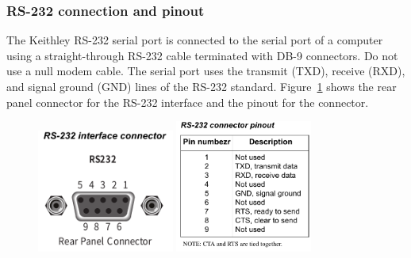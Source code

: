 \subsubsection{RS-232 connection and pinout}
The Keithley RS-232 serial port is connected to the serial port of a computer
using a straight-through RS-232 cable terminated with DB-9 connectors. Do not
use a null modem cable. The serial port uses the transmit (TXD), receive (RXD),
and signal ground (GND) lines of the RS-232
standard. Figure~\ref{RS232-pinout-instrument} shows the rear panel connector
for the RS-232 interface and the pinout for the connector.
\begin{figure}[ht]
  \centering \includegraphics[width=0.4\textwidth]{RS232-pinout-connector}\hfill
  \centering \includegraphics[width=0.4\textwidth]{RS232-pinout-instrument}
  \caption{}\label{RS232-pinout-instrument}
\end{figure}

